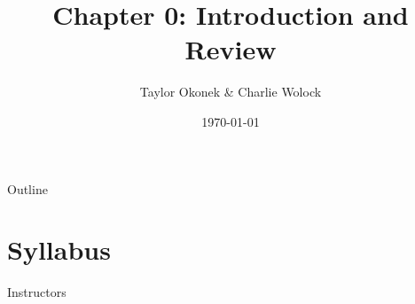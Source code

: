 \documentclass{beamer}
\title{Chapter 0: Introduction and Review}
\author{Taylor Okonek \& Charlie Wolock}
\date{\today}
\begin{document}
	\begin{frame}
	\titlepage 
\end{frame}
\begin{frame}{Outline}
\tableofcontents
\end{frame}


\section{Syllabus}

\begin{frame}{Instructors}


\end{frame}
\end{document}
